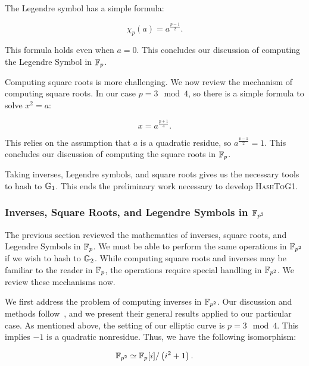 \noindent
The Legendre symbol has a simple formula:

\begin{equation}
    \chi_{p}(a) = a^{\frac{p-1}{2}}.
\end{equation}

\noindent
This formula holds even when $a=0$.
This concludes our discussion of computing the Legendre Symbol in $\mathbb{F}_{p}$.

Computing square roots is more challenging.
We now review the mechanism of computing square roots.
In our case $p = 3\mod 4$, so there is a simple
formula to solve $x^{2} = a$:

\begin{equation}
    x = a^{\frac{p+1}{4}}.
\end{equation}

\noindent
This relies on the assumption that $a$ is a quadratic residue,
so $a^{\frac{p-1}{2}} = 1$.
This concludes our discussion of computing the square roots in $\mathbb{F}_{p}$.

Taking inverses, Legendre symbols, and square roots
gives us the necessary tools to hash to $\mathbb{G}_{1}$.
This ends the preliminary work necessary to develop
\textsc{HashToG1}.


\subsubsection{Inverses, Square Roots, and Legendre Symbols
    in $\mathbb{F}_{p^{2}}$}
\label{sssec:finite_math_Fp2}

The previous section reviewed the mathematics of inverses, square roots, and
Legendre Symbols in $\mathbb{F}_{p}$.
We must be able to perform the same operations
in $\mathbb{F}_{p^{2}}$ if we wish to hash to $\mathbb{G}_{2}$.
While computing square roots and
inverses may be familiar to the reader in $\mathbb{F}_{p}$, the operations require
special handling in $\mathbb{F}_{p^{2}}$.
We review these mechanisms now.

We first address the problem of computing inverses in $\mathbb{F}_{p^{2}}$.
Our discussion and methods follow~\cite{adj2012sqrtEvenExt},
and we present their general results applied to our particular case.
As mentioned above, the setting of our elliptic curve is $p = 3\mod 4$.
This implies $-1$ is a quadratic nonresidue.
Thus, we have the following isomorphism:

\begin{equation}
    \mathbb{F}_{p^{2}} \simeq \mathbb{F}_{p}[i]/\left( i^{2}+1 \right).
\end{equation}


